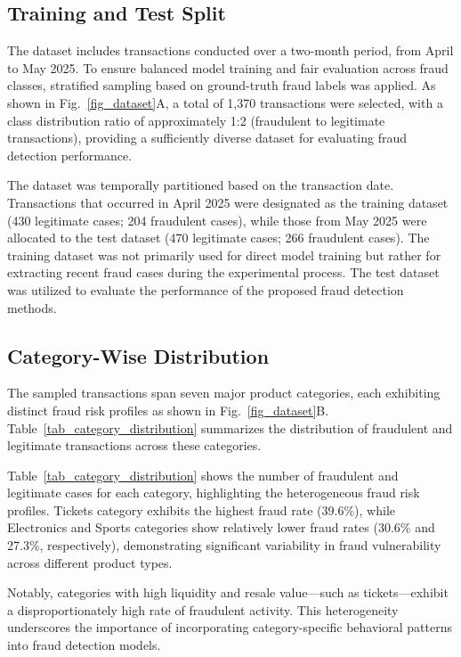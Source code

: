 \documentclass[sigconf]{acmart}
\begin{document}
\subsection{Training and Test Split}
The dataset includes transactions conducted over a two-month period, from April to May 2025. To ensure balanced model training and fair evaluation across fraud classes, stratified sampling based on ground-truth fraud labels was applied. As shown in Fig.~\ref{fig_dataset}A, a total of 1,370 transactions were selected, with a class distribution ratio of approximately 1:2 (fraudulent to legitimate transactions), providing a sufficiently diverse dataset for evaluating fraud detection performance.

The dataset was temporally partitioned based on the transaction date. Transactions that occurred in April 2025 were designated as the training dataset (430 legitimate cases; 204 fraudulent cases), while those from May 2025 were allocated to the test dataset (470 legitimate cases; 266 fraudulent cases). The training dataset was not primarily used for direct model training but rather for extracting recent fraud cases during the experimental process. The test dataset was utilized to evaluate the performance of the proposed fraud detection methods.



\subsection{Category-Wise Distribution}
The sampled transactions span seven major product categories, each exhibiting distinct fraud risk profiles as shown in Fig.~\ref{fig_dataset}B. Table~\ref{tab_category_distribution} summarizes the distribution of fraudulent and legitimate transactions across these categories.

Table~\ref{tab_category_distribution} shows the number of fraudulent and legitimate cases for each category, highlighting the heterogeneous fraud risk profiles. Tickets category exhibits the highest fraud rate (39.6\%), while Electronics and Sports categories show relatively lower fraud rates (30.6\% and 27.3\%, respectively), demonstrating significant variability in fraud vulnerability across different product types.

Notably, categories with high liquidity and resale value—such as tickets—exhibit a disproportionately high rate of fraudulent activity. This heterogeneity underscores the importance of incorporating category-specific behavioral patterns into fraud detection models.
\end{document}
